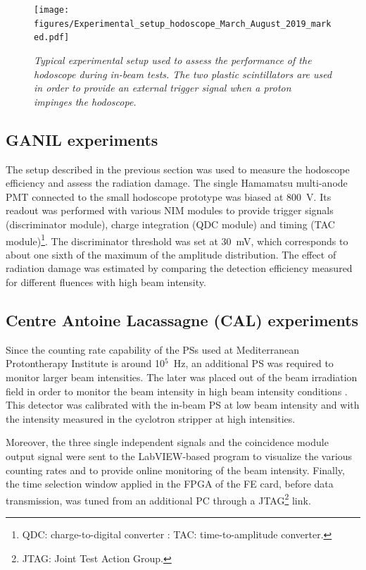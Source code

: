 \documentclass[a4paper,11pt]{article}
\begin{document}
\begin{figure}[htb]
\centering
\texttt{[image: figures/Experimental\_setup\_hodoscope\_March\_August\_2019\_marked.pdf]}
\caption{\small{\textit{Typical experimental setup used to assess the performance of the hodoscope during in-beam tests. The two plastic scintillators are used in order to provide an external trigger signal when a proton impinges the hodoscope.}}}
\label{fig:Picture_Setup_hodo}
\end{figure}


\subsection{GANIL experiments}

The setup described in the previous section was used to measure the hodoscope efficiency and assess the radiation damage. The single Hamamatsu multi-anode PMT connected to the small hodoscope prototype was biased at 800~V. Its readout was performed with various NIM modules to provide trigger signals (discriminator module), charge integration (QDC module) and timing (TAC module)\footnote{QDC: charge-to-digital converter : TAC: time-to-amplitude converter.}. The discriminator threshold was set at 30~mV, which corresponds to about one sixth of the maximum of the amplitude distribution. The effect of radiation damage was estimated by comparing the detection efficiency measured for different fluences with high beam intensity.

\subsection{Centre Antoine Lacassagne (CAL) experiments}
\label{In-beam_tests}

Since the counting rate capability of the PSs used at Mediterranean Protontherapy Institute is around {10}$^{5}$~Hz, an additional PS was required to monitor larger beam intensities. The later was placed out of the beam irradiation field in order to monitor the beam intensity in high beam intensity conditions \cite{Kelleter2017, Martins2020} . This detector was calibrated with the in-beam PS at low beam intensity and with the intensity measured in the cyclotron stripper at high intensities. 

Moreover, the three single independent signals and the coincidence module output signal were sent to the LabVIEW-based program to visualize the various counting rates and to provide online monitoring of the beam intensity. 
Finally, the time selection window applied in the FPGA of the FE card, before data transmission, was tuned from an additional PC through a JTAG\footnote{JTAG: Joint Test Action Group.} link.
\end{document}
